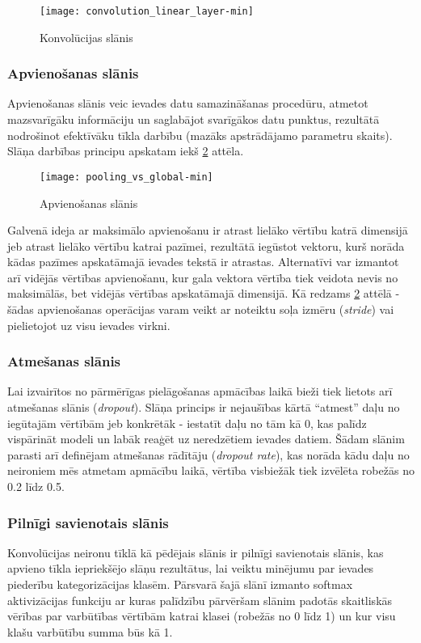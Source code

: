 \begin{figure}[H]
	\texttt{[image: convolution\_linear\_layer-min]}
	\caption{Konvolūcijas slānis \cite{TextCNNLena}}
	\label{fig:convolution_linear_layer}
\end{figure}

\subsubsection{Apvienošanas slānis}

Apvienošanas slānis veic ievades datu samazināšanas procedūru, atmetot mazsvarīgāku informāciju un saglabājot svarīgākos datu punktus, rezultātā nodrošinot efektīvāku tīkla darbību (mazāks apstrādājamo parametru skaits). Slāņa darbības principu apskatam iekš \ref{fig:pooling_vs_global} attēla.

\begin{figure}[H]
	\texttt{[image: pooling\_vs\_global-min]}
	\caption{Apvienošanas slānis \cite{TextCNNLena}}
	\label{fig:pooling_vs_global}
\end{figure}

Galvenā ideja ar maksimālo apvienošanu ir atrast lielāko vērtību katrā dimensijā jeb atrast lielāko vērtību katrai pazīmei, rezultātā iegūstot vektoru, kurš norāda kādas pazīmes apskatāmajā ievades tekstā ir atrastas. Alternatīvi var izmantot arī vidējās vērtības apvienošanu, kur gala vektora vērtība tiek veidota nevis no maksimālās, bet vidējās vērtības apskatāmajā dimensijā. Kā redzams \ref{fig:pooling_vs_global} attēlā - šādas apvienošanas operācijas varam veikt ar noteiktu soļa izmēru (\textit{stride}) vai pielietojot uz visu ievades virkni. 

\subsubsection{Atmešanas slānis}
Lai izvairītos no pārmērīgas pielāgošanas apmācības laikā bieži tiek lietots arī atmešanas slānis (\textit{dropout}). Slāņa princips ir nejaušības kārtā “atmest” daļu no iegūtajām vērtībām jeb konkrētāk - iestatīt daļu no tām kā 0, kas palīdz vispārināt modeli un labāk reaģēt uz neredzētiem ievades datiem. Šādam slānim parasti arī definējam atmešanas rādītāju (\textit{dropout rate}), kas norāda kādu daļu no neironiem mēs atmetam apmācību laikā, vērtība visbiežāk tiek izvēlēta robežās no 0.2 līdz 0.5.

\subsubsection{Pilnīgi savienotais slānis}
Konvolūcijas neironu tīklā kā pēdējais slānis ir pilnīgi savienotais slānis, kas apvieno tīkla iepriekšējo slāņu rezultātus, lai veiktu minējumu par ievades piederību kategorizācijas klasēm. Pārsvarā šajā slānī izmanto softmax aktivizācijas funkciju ar kuras palīdzību pārvēršam slānim padotās skaitliskās vērības par varbūtības vērtībām katrai klasei (robežās no 0 līdz 1) un kur visu klašu varbūtību summa būs kā 1. 

